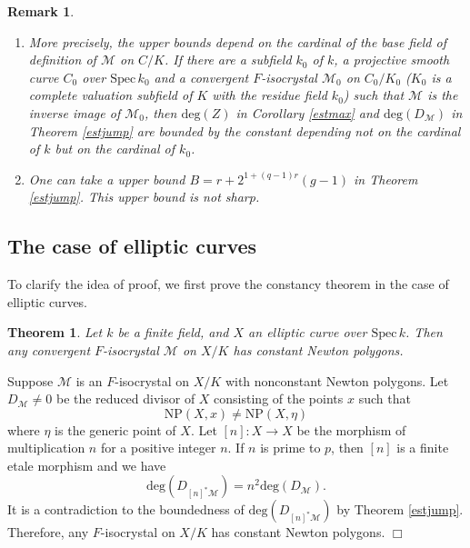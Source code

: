 \documentclass[11pt]{amsart}
\newtheorem{theorem}[Lemma]{Theorem}
\newtheorem{remark}[Lemma]{Remark}
\begin{document}
\begin{remark}\label{preest}
\begin{enumerate}
\item
More precisely, the upper bounds depend on the cardinal of the base field of definition of $\mathcal M$ 
on $C/K$. If there are a subfield $k_0$ of $k$, a projective smooth curve $C_0$ over $\mathrm{Spec}\, k_0$ and 
a convergent $F$-isocrystal $\mathcal M_0$ on $C_0/K_0$ ($K_0$ is a complete valuation subfield of $K$ with 
the residue field $k_0$) such that $\mathcal M$ is the inverse image of $\mathcal M_0$, 
then $\mathrm{deg}(Z)$ in Corollary \ref{estmax} and $\mathrm{deg}(D_{\mathcal M})$ in Theorem \ref{estjump}
are bounded by the constant depending not on the cardinal of $k$ but on the cardinal of $k_0$. 
\item One can take a upper bound $B = r + 2^{1 + (q-1)r}(g-1)$ 
in Theorem \ref{estjump}. 
This upper bound is not sharp. 
\end{enumerate}
\end{remark}

\subsection{The case of elliptic curves} 
To clarify the idea of proof, we first prove the constancy theorem in the case of elliptic curves. 

\begin{theorem}\label{ECconst} Let $k$ be a finite field, and $X$ an elliptic curve  over $\mathrm{Spec}\, k$. 
Then any convergent $F$-isocrystal $\mathcal M$ on $X/K$ has constant Newton polygons. 
\end{theorem}

{ {Suppose $\mathcal M$ is an $F$-isocrystal on $X/K$ with 
nonconstant Newton polygons. 
Let $D_{\mathcal M} \ne 0$ be the reduced divisor of $X$ consisting of the points $x$ such that 
$$
     \mathrm{NP}(X, x) \ne \mathrm{NP}(X, \eta)
$$
where $\eta$ is the generic point of $X$. 
Let $[n] : X \rightarrow X$ be the morphism of multiplication $n$ 
for a positive integer $n$. 
If $n$ is prime to $p$, then $[n]$ is a finite etale morphism and we have 
$$
     \mathrm{deg}(D_{[n]^\ast\mathcal M}) = n^2\mathrm{deg}(D_{\mathcal M}). 
$$
It is a contradiction to the boundedness of $\mathrm{deg}(D_{[n]^\ast\mathcal M})$ 
by Theorem \ref{estjump}. 
Therefore, any $F$-isocrystal on $X/K$ has constant Newton polygons. 
} \hspace*{\fill} $\Box$}
\end{document}
